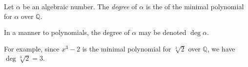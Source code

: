 \documentclass[12pt]{article}
\begin{document}

Let $\alpha$ be an algebraic number.  The \emph{degree} of $\alpha$ is the  of the minimal polynomial for $\alpha$ over $\mathbb{Q}$.

In a  manner to polynomials, the degree of $\alpha$ may be denoted $\deg\alpha$.

For example, since $x^3-2$ is the minimal polynomial for $\sqrt[3]{2}$ over $\mathbb{Q}$, we have $\deg\sqrt[3]{2}=3$.
\end{document}
